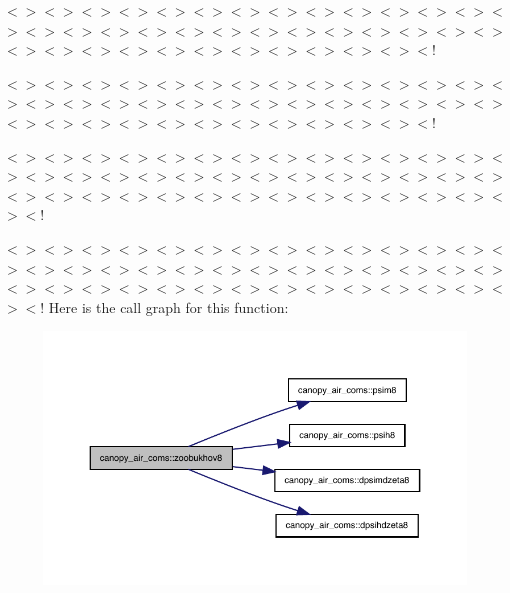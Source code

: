 $<$$>$$<$$>$$<$$>$$<$$>$$<$$>$$<$$>$$<$$>$$<$$>$$<$$>$$<$$>$$<$$>$$<$$>$$<$$>$$<$$>$$<$$>$$<$$>$$<$$>$$<$$>$$<$$>$$<$$>$$<$$>$$<$$>$$<$$>$$<$$>$$<$$>$$<$$>$$<$$>$$<$$>$$<$$>$$<$$>$$<$$>$$<$$>$$<$$>$$<$$>$$<$$>$$<$$>$$<$$>$$<$$>$$<$!

$<$$>$$<$$>$$<$$>$$<$$>$$<$$>$$<$$>$$<$$>$$<$$>$$<$$>$$<$$>$$<$$>$$<$$>$$<$$>$$<$$>$$<$$>$$<$$>$$<$$>$$<$$>$$<$$>$$<$$>$$<$$>$$<$$>$$<$$>$$<$$>$$<$$>$$<$$>$$<$$>$$<$$>$$<$$>$$<$$>$$<$$>$$<$$>$$<$$>$$<$$>$$<$$>$$<$$>$$<$$>$$<$$>$$<$!

$<$$>$$<$$>$$<$$>$$<$$>$$<$$>$$<$$>$$<$$>$$<$$>$$<$$>$$<$$>$$<$$>$$<$$>$$<$$>$$<$$>$$<$$>$$<$$>$$<$$>$$<$$>$$<$$>$$<$$>$$<$$>$$<$$>$$<$$>$$<$$>$$<$$>$$<$$>$$<$$>$$<$$>$$<$$>$$<$$>$$<$$>$$<$$>$$<$$>$$<$$>$$<$$>$$<$$>$$<$$>$$<$$>$$<$$>$$<$$>$$<$$>$$<$!

$<$$>$$<$$>$$<$$>$$<$$>$$<$$>$$<$$>$$<$$>$$<$$>$$<$$>$$<$$>$$<$$>$$<$$>$$<$$>$$<$$>$$<$$>$$<$$>$$<$$>$$<$$>$$<$$>$$<$$>$$<$$>$$<$$>$$<$$>$$<$$>$$<$$>$$<$$>$$<$$>$$<$$>$$<$$>$$<$$>$$<$$>$$<$$>$$<$$>$$<$$>$$<$$>$$<$$>$$<$$>$$<$$>$$<$$>$$<$$>$$<$$>$$<$! Here is the call graph for this function\+:
\nopagebreak
\begin{figure}[H]
\begin{center}
\leavevmode
\includegraphics[width=350pt]{namespacecanopy__air__coms_afef697305b4b30385c5206f48d9e787c_cgraph}
\end{center}
\end{figure}
\mbox{\label{namespacecanopy__air__coms_a5251266695c581c8f4058d98f6c86200}} 

